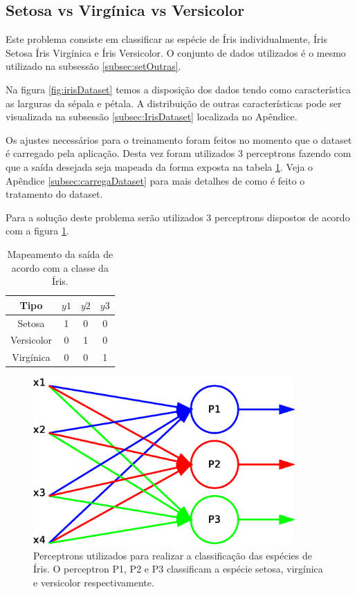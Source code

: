 \documentclass[12pt,journal,onecolumn]{IEEEtran}
\begin{document}
\subsection{Setosa vs Virgínica vs Versicolor}
Este problema consiste em classificar as espécie de Íris individualmente,
Íris Setosa Íris Virgínica e Íris Versicolor. O conjunto de dados utilizados é o
mesmo utilizado na subsessão \ref{subsec:setOutras}.

Na figura \ref{fig:irisDataset} temos a disposição dos dados tendo como
característica as larguras da sépala e pétala. A distribuição de outras
características pode ser visualizada na subsessão \ref{subsec:IrisDataset}
localizada no Apêndice.

Os ajustes necessários para o treinamento foram feitos no momento que o dataset
é carregado pela aplicação. Desta vez foram utilizados 3 perceptrons fazendo
com que a saída desejada seja mapeada da forma exposta na tabela \ref{tab:mapMLP}.
Veja o Apêndice \ref{subsec:carregaDataset} para mais detalhes de como é feito o tratamento do dataset.

Para a solução deste problema serão utilizados 3 perceptrons dispostos de acordo
com a figura \ref{fig:mlp}.

\begin{table}[!htbp]  
\caption{Mapeamento da saída de acordo com a classe da Íris.}						 
\label{tab:mapMLP}
\centering
	\begin{tabular}{| c | c | c | c |}
		\hline
		 Tipo 		 &	$y1$ & 	$y2$ 	& 	$y3$ \\ \hline
		 Setosa      & 	1 	 & 	0		&	0 \\ \hline
		 Versicolor  & 	0 	 & 	1		&	0 \\ \hline
		 Virgínica 	 & 	0 	 & 	0		&	1 \\ 
		\hline
	\end{tabular}
\end{table}



\begin{figure}[!htbp]
	\centering
	\includegraphics[width=10cm]
	{eps/3classes/mlp.eps}
	\caption{Perceptrons utilizados para realizar a classificação das espécies de
	Íris. O perceptron P1, P2 e P3 classificam a espécie setosa, virgínica
	e versicolor respectivamente.}
	\label{fig:mlp} 
\end{figure} 
\end{document}
